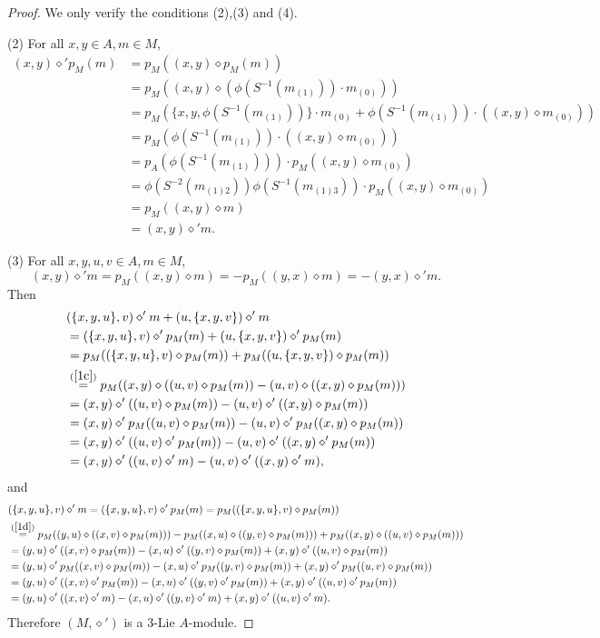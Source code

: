 \documentclass[11pt]{article}
\def\di{\diamond}
\begin{document}
\begin{proof}
We only verify the conditions (2),(3) and (4).

(2) For all $x,y\in A,m\in M$,
\begin{align*}
(x,y)\di'p_M(m)&=p_M((x,y)\di p_M(m))\\
&=p_M((x,y)\di (\phi(S^{-1}(m_{(1)}))\cdot m_{(0)}))\\
&=p_M(\{x,y,\phi(S^{-1}(m_{(1)}))\}\cdot m_{(0)}+\phi(S^{-1}(m_{(1)}))\cdot((x,y)\di m_{(0)}))\\
&=p_M(\phi(S^{-1}(m_{(1)}))\cdot((x,y)\di m_{(0)}))\\
&=p_A(\phi(S^{-1}(m_{(1)})))\cdot p_M((x,y)\di m_{(0)})\\
&=\phi(S^{-2}(m_{(1)2}))\phi(S^{-1}(m_{(1)3}))\cdot p_M((x,y)\di m_{(0)})\\
&=p_M((x,y)\di m)\\
&=(x,y)\di' m.
\end{align*}

(3) For all $x,y,u,v\in A,m\in M$, 
$$(x,y)\di' m=p_M((x,y)\di m)=-p_M((y,x)\di m)=-(y,x)\di' m.$$
Then
\begin{align*}
&(\{x,y,u\},v)\di' m+(u,\{x,y,v\})\di' m\\
&=(\{x,y,u\},v)\di' p_M(m)+(u,\{x,y,v\})\di' p_M(m)\\
&=p_M((\{x,y,u\},v)\di p_M(m))+p_M((u,\{x,y,v\})\di p_M(m))\\
&\stackrel{(\ref{1c})}{=}p_M((x, y)\di((u,v)\di p_M(m))-(u,v)\di((x, y)\di p_M(m)))\\
&=(x, y)\di'((u,v)\di p_M(m))-(u,v)\di'((x, y)\di p_M(m))\\
&=(x, y)\di' p_M((u,v)\di p_M(m))-(u,v)\di'p_M((x, y)\di p_M(m))\\
&=(x, y)\di' ((u,v)\di' p_M(m))-(u,v)\di'((x, y)\di' p_M(m))\\
&=(x, y)\di'((u,v)\di' m)-(u,v)\di'((x, y)\di' m),
\end{align*}
and
\begin{align*}
&(\{x,y,u\},v)\di' m=(\{x,y,u\},v)\di' p_M(m)=p_M((\{x,y,u\},v)\di p_M(m))\\
&\stackrel{(\ref{1d})}{=}p_M((y,u)\di((x,v)\di p_M(m)))-p_M((x,u)\di((y,v)\di p_M(m)))+p_M((x,y)\di((u,v)\di p_M(m)))\\
&=(y,u)\di'((x,v)\di p_M(m))-(x,u)\di'((y,v)\di p_M(m))+(x,y)\di'((u,v)\di p_M(m))\\
&=(y,u)\di'p_M((x,v)\di p_M(m))-(x,u)\di'p_M((y,v)\di p_M(m))+(x,y)\di'p_M((u,v)\di p_M(m))\\
&=(y,u)\di'((x,v)\di' p_M(m))-(x,u)\di'((y,v)\di' p_M(m))+(x,y)\di'((u,v)\di' p_M(m))\\
&=(y,u)\di'((x,v)\di' m)-(x,u)\di'((y,v)\di' m)+(x,y)\di'((u,v)\di' m).
\end{align*}
Therefore $(M,\di')$ is a 3-Lie $A$-module.


\end{proof}
\end{document}
